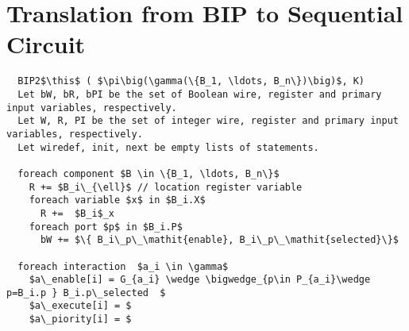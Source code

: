\section{Translation from BIP to Sequential Circuit}
\label{sect-translation}

\begin{lstlisting}
  BIP2$\this$ ( $\pi\big(\gamma(\{B_1, \ldots, B_n\})\big)$, K)
  Let bW, bR, bPI be the set of Boolean wire, register and primary input variables, respectively.
  Let W, R, PI be the set of integer wire, register and primary input variables, respectively.
  Let wiredef, init, next be empty lists of statements. 

  foreach component $B \in \{B_1, \ldots, B_n\}$
    R += $B_i\_{\ell}$ // location register variable
    foreach variable $x$ in $B_i.X$
      R +=  $B_i$_x
    foreach port $p$ in $B_i.P$ 
      bW += $\{ B_i\_p\_\mathit{enable}, B_i\_p\_\mathit{selected}\}$

  foreach interaction  $a_i \in \gamma$
    $a\_enable[i] = G_{a_i} \wedge \bigwedge_{p\in P_{a_i}\wedge p=B_i.p } B_i.p\_selected  $ 
    $a\_execute[i] = $
    $a\_piority[i] = $

      

\end{lstlisting}

